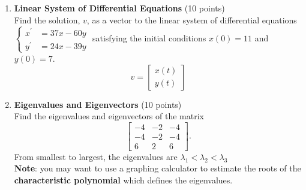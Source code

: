 \begin{enumerate}
  \newpage

  \item \textbf{Linear System of Differential Equations} (10 points)\\
  Find the solution, $v$, as a vector to the linear system of differential equations 
  $\left\{\begin{array}{ll}x^{\prime} & =37 x-60 y \\ y^{\prime} & =24 x-39 y\end{array}\right.$ 
  satisfying the initial conditions $x(0)=11$ and $y(0)=7$.
  $$v=\left[\begin{array}{l}
    x(t) \\
    y(t) 
  \end{array}\right]
  $$
  \begin{subanswer}
  \end{subanswer}

  \item \textbf{Eigenvalues and Eigenvectors} (10 points)\\
  Find the eigenvalues and eigenvectors of the matrix
  $$
  \left[\begin{array}{ccc}
  -4 & -2 & -4 \\
  -4 & -2 & -4 \\
  6 & 2 & 6
  \end{array}\right] .
  $$
  From smallest to largest, the eigenvalues are $\lambda_1<\lambda_2<\lambda_3$\\
  \textbf{Note}: you may want to use a graphing calculator to estimate the roots of 
  the \textbf{characteristic polynomial} which defines the eigenvalues.
  \begin{subanswer}
  \end{subanswer}

  \newpage


\end{enumerate}
